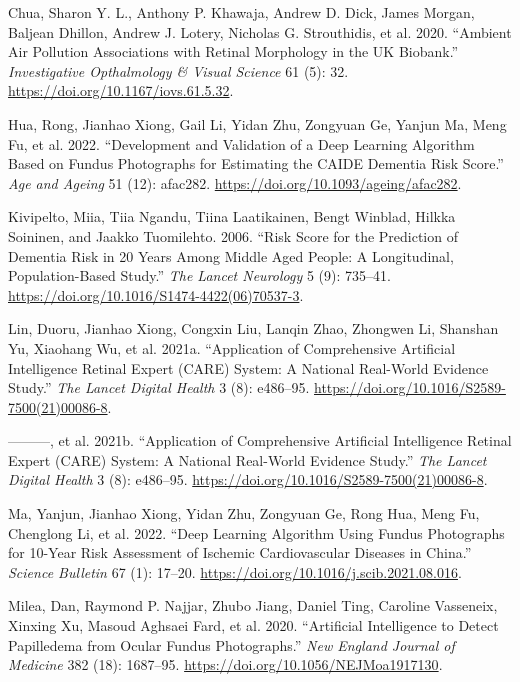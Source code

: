 \documentclass[
  Letterpaper,
]{scrbook}
\newlength{\cslhangindent}
\newenvironment{CSLReferences}[2] %
 {\begin{list}{}{%
  \setlength{\itemindent}{0pt}
  \setlength{\leftmargin}{0pt}
  \setlength{\parsep}{0pt}
  \ifodd #1
   \setlength{\leftmargin}{\cslhangindent}
   \setlength{\itemindent}{-1\cslhangindent}
  \fi
  \setlength{\itemsep}{#2\baselineskip}}}
 {\end{list}}
\begin{document}
\label{refs}
\begin{CSLReferences}{1}{0}
Chua, Sharon Y. L., Anthony P. Khawaja, Andrew D. Dick, James Morgan,
Baljean Dhillon, Andrew J. Lotery, Nicholas G. Strouthidis, et al. 2020.
{``Ambient {Air} {Pollution} {Associations} with {Retinal} {Morphology}
in the {UK} {Biobank}.''} \emph{Investigative Opthalmology \& Visual
Science} 61 (5): 32. \url{https://doi.org/10.1167/iovs.61.5.32}.

Hua, Rong, Jianhao Xiong, Gail Li, Yidan Zhu, Zongyuan Ge, Yanjun Ma,
Meng Fu, et al. 2022. {``Development and Validation of a Deep Learning
Algorithm Based on Fundus Photographs for Estimating the {CAIDE}
Dementia Risk Score.''} \emph{Age and Ageing} 51 (12): afac282.
\url{https://doi.org/10.1093/ageing/afac282}.

Kivipelto, Miia, Tiia Ngandu, Tiina Laatikainen, Bengt Winblad, Hilkka
Soininen, and Jaakko Tuomilehto. 2006. {``Risk Score for the Prediction
of Dementia Risk in 20 Years Among Middle Aged People: A Longitudinal,
Population-Based Study.''} \emph{The Lancet Neurology} 5 (9): 735--41.
\url{https://doi.org/10.1016/S1474-4422(06)70537-3}.

Lin, Duoru, Jianhao Xiong, Congxin Liu, Lanqin Zhao, Zhongwen Li,
Shanshan Yu, Xiaohang Wu, et al. 2021a. {``Application of
{Comprehensive} {Artificial} Intelligence {Retinal} {Expert} ({CARE})
System: A National Real-World Evidence Study.''} \emph{The Lancet
Digital Health} 3 (8): e486--95.
\url{https://doi.org/10.1016/S2589-7500(21)00086-8}.

---------, et al. 2021b. {``Application of {Comprehensive} {Artificial}
Intelligence {Retinal} {Expert} ({CARE}) System: A National Real-World
Evidence Study.''} \emph{The Lancet Digital Health} 3 (8): e486--95.
\url{https://doi.org/10.1016/S2589-7500(21)00086-8}.

Ma, Yanjun, Jianhao Xiong, Yidan Zhu, Zongyuan Ge, Rong Hua, Meng Fu,
Chenglong Li, et al. 2022. {``Deep Learning Algorithm Using Fundus
Photographs for 10-Year Risk Assessment of Ischemic Cardiovascular
Diseases in {China}.''} \emph{Science Bulletin} 67 (1): 17--20.
\url{https://doi.org/10.1016/j.scib.2021.08.016}.

Milea, Dan, Raymond P. Najjar, Zhubo Jiang, Daniel Ting, Caroline
Vasseneix, Xinxing Xu, Masoud Aghsaei Fard, et al. 2020. {``Artificial
{Intelligence} to {Detect} {Papilledema} from {Ocular} {Fundus}
{Photographs}.''} \emph{New England Journal of Medicine} 382 (18):
1687--95. \url{https://doi.org/10.1056/NEJMoa1917130}.


\end{CSLReferences}
\end{document}
